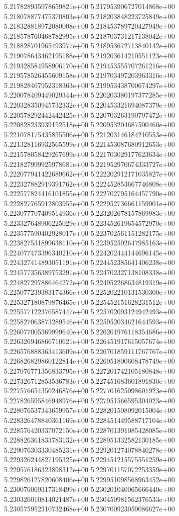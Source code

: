 5.217828935978659821e+00
5.217953906727014868e+00
5.218078877475370803e+00
5.218203848223725849e+00
5.218328818972080008e+00
5.218453789720427949e+00
5.218578760468782995e+00
5.218703731217138042e+00
5.218828701965493977e+00
5.218953672713840142e+00
5.219078643462195188e+00
5.219203614210551123e+00
5.219328584958906170e+00
5.219453555707261216e+00
5.219578526455609158e+00
5.219703497203963316e+00
5.219828467952318363e+00
5.219953438700674297e+00
5.220078409449029344e+00
5.220203380197377285e+00
5.220328350945732332e+00
5.220453321694087379e+00
5.220578292442442425e+00
5.220703263190797472e+00
5.220828233939152518e+00
5.220953204687500460e+00
5.221078175435855506e+00
5.221203146184210553e+00
5.221328116932565599e+00
5.221453087680912653e+00
5.221578058429267699e+00
5.221703029177623634e+00
5.221827999925978681e+00
5.221952970674333727e+00
5.222077941422689662e+00
5.222202912171035827e+00
5.222327882919391762e+00
5.222452853667746808e+00
5.222577824416101855e+00
5.222702795164457790e+00
5.222827765912803955e+00
5.222952736661159001e+00
5.223077707409514936e+00
5.223202678157869983e+00
5.223327648906225029e+00
5.223452619654572970e+00
5.223577590402928017e+00
5.223702561151282175e+00
5.223827531899638110e+00
5.223952502647985163e+00
5.224077473396340210e+00
5.224202444144696145e+00
5.224327414893051191e+00
5.224452385641406238e+00
5.224577356389753291e+00
5.224702327138108338e+00
5.224827297886464272e+00
5.224952268634819319e+00
5.225077239383174366e+00
5.225202210131530300e+00
5.225327180879876465e+00
5.225452151628231512e+00
5.225577122376587447e+00
5.225702093124942493e+00
5.225827063873289546e+00
5.225952034621644593e+00
5.226077005369999640e+00
5.226201976118354686e+00
5.226326946866710621e+00
5.226451917615057674e+00
5.226576888363413609e+00
5.226701859111767767e+00
5.226826829860122814e+00
5.226951800608478749e+00
5.227076771356833795e+00
5.227201742105180848e+00
5.227326712853536783e+00
5.227451683601891830e+00
5.227576654350246876e+00
5.227701625098601923e+00
5.227826595846948976e+00
5.227951566595304023e+00
5.228076537343659957e+00
5.228201508092015004e+00
5.228326478840361169e+00
5.228451449588717104e+00
5.228576420337072150e+00
5.228701391085428085e+00
5.228826361833783132e+00
5.228951332582130185e+00
5.229076303330485231e+00
5.229201274078840278e+00
5.229326244827195325e+00
5.229451215575551259e+00
5.229576186323898312e+00
5.229701157072253359e+00
5.229826127820608406e+00
5.229951098568963452e+00
5.230076069317318499e+00
5.230201040065666440e+00
5.230326010814021487e+00
5.230450981562376533e+00
5.230575952310732468e+00
5.230700923059086627e+00
